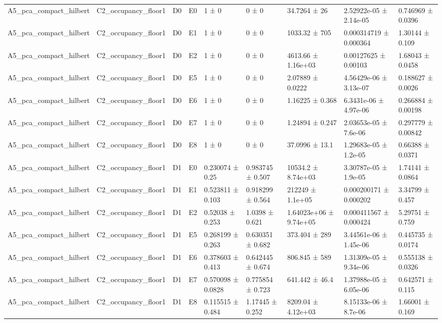 \begin{table}
\begin{tabular}{lllllllll}
A5\_pca\_compact\_hilbert & C2\_occupancy\_floor1 & D0 & E0 & 1 ± 0 & 0 ± 0 & 34.7264 ± 26 & 2.52922e-05 ± 2.14e-05 & 0.746969 ± 0.0396 \\
A5\_pca\_compact\_hilbert & C2\_occupancy\_floor1 & D0 & E1 & 1 ± 0 & 0 ± 0 & 1033.32 ± 705 & 0.000314719 ± 0.000364 & 1.30144 ± 0.109 \\
A5\_pca\_compact\_hilbert & C2\_occupancy\_floor1 & D0 & E2 & 1 ± 0 & 0 ± 0 & 4613.66 ± 1.16e+03 & 0.00127625 ± 0.00103 & 1.68043 ± 0.0458 \\
A5\_pca\_compact\_hilbert & C2\_occupancy\_floor1 & D0 & E5 & 1 ± 0 & 0 ± 0 & 2.07889 ± 0.0222 & 4.56429e-06 ± 3.13e-07 & 0.188627 ± 0.0026 \\
A5\_pca\_compact\_hilbert & C2\_occupancy\_floor1 & D0 & E6 & 1 ± 0 & 0 ± 0 & 1.16225 ± 0.368 & 6.3431e-06 ± 4.97e-06 & 0.266884 ± 0.00198 \\
A5\_pca\_compact\_hilbert & C2\_occupancy\_floor1 & D0 & E7 & 1 ± 0 & 0 ± 0 & 1.24894 ± 0.247 & 2.03653e-05 ± 7.6e-06 & 0.297779 ± 0.00842 \\
A5\_pca\_compact\_hilbert & C2\_occupancy\_floor1 & D0 & E8 & 1 ± 0 & 0 ± 0 & 37.0996 ± 13.1 & 1.29683e-05 ± 1.2e-05 & 0.66388 ± 0.0371 \\
A5\_pca\_compact\_hilbert & C2\_occupancy\_floor1 & D1 & E0 & 0.230074 ± 0.25 & 0.983745 ± 0.507 & 10534.2 ± 8.74e+03 & 3.30787e-05 ± 1.9e-05 & 1.74141 ± 0.0864 \\
A5\_pca\_compact\_hilbert & C2\_occupancy\_floor1 & D1 & E1 & 0.523811 ± 0.103 & 0.918299 ± 0.564 & 212249 ± 1.1e+05 & 0.000200171 ± 0.000202 & 3.34799 ± 0.457 \\
A5\_pca\_compact\_hilbert & C2\_occupancy\_floor1 & D1 & E2 & 0.52038 ± 0.253 & 1.0398 ± 0.621 & 1.64023e+06 ± 9.74e+05 & 0.000411567 ± 0.000424 & 5.29751 ± 0.759 \\
A5\_pca\_compact\_hilbert & C2\_occupancy\_floor1 & D1 & E5 & 0.268199 ± 0.263 & 0.630351 ± 0.682 & 373.404 ± 289 & 3.44561e-06 ± 1.45e-06 & 0.445735 ± 0.0174 \\
A5\_pca\_compact\_hilbert & C2\_occupancy\_floor1 & D1 & E6 & 0.378603 ± 0.413 & 0.642445 ± 0.674 & 806.845 ± 589 & 1.31309e-05 ± 9.34e-06 & 0.555138 ± 0.0326 \\
A5\_pca\_compact\_hilbert & C2\_occupancy\_floor1 & D1 & E7 & 0.570098 ± 0.0828 & 0.775854 ± 0.723 & 641.442 ± 46.4 & 1.37988e-05 ± 6.05e-06 & 0.642571 ± 0.115 \\
A5\_pca\_compact\_hilbert & C2\_occupancy\_floor1 & D1 & E8 & 0.115515 ± 0.484 & 1.17445 ± 0.252 & 8209.04 ± 4.12e+03 & 8.15133e-06 ± 8.7e-06 & 1.66001 ± 0.169 \\

\end{tabular}
\end{table}
